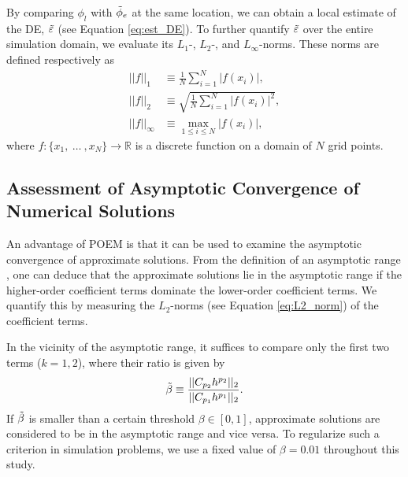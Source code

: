 By comparing $\phi_l$ with $\Tilde{\phi}_e$ at the same location, we can obtain a local estimate of the DE, $\Tilde{\varepsilon}$ (see Equation \ref{eq:est_DE}). To further quantify $\Tilde{\varepsilon}$ over the entire simulation domain, we evaluate its $L_1$-, $L_2$-, and $L_{\infty}$-norms. These norms are defined respectively as
\begin{align}
    ||f||_1 &\equiv \frac{1}{N}\sum_{i=1}^{N}|f(x_i)|, \label{eq:L1_norm} \\
    ||f||_2 &\equiv \sqrt{\frac{1}{N}\sum_{i=1}^{N}|f(x_i)|^2}, \label{eq:L2_norm} \\
    ||f||_{\infty} &\equiv \max_{1 \leq i \leq N} |f(x_i)|, \label{eq:L8_norm}
\end{align}
where $f:\{x_1,\ \dots \ ,x_N\} \rightarrow \mathbb{R}$ is a discrete function on a domain of $N$ grid points.


\subsection{Assessment of Asymptotic Convergence of Numerical Solutions}
An advantage of POEM is that it can be used to examine the asymptotic convergence of approximate solutions. From the definition of an asymptotic range \cite{Roy2010}, one can deduce that the approximate solutions lie in the asymptotic range if the higher-order coefficient terms dominate the lower-order coefficient terms. We quantify this by measuring the $L_2$-norms (see Equation \ref{eq:L2_norm}) of the coefficient terms.

In the vicinity of the asymptotic range, it suffices to compare only the first two terms ($k = 1,2$), where their ratio is given by
\begin{equation} \label{eq:beta_tilde}
    \Tilde{\beta} \equiv \frac{||C_{p_2} h^{p_2}||_2}{||C_{p_1} h^{p_1}||_2}.
\end{equation}
If $\Tilde{\beta}$ is smaller than a certain threshold $\beta \in [0,1]$, approximate solutions are considered to be in the asymptotic range and vice versa. To regularize such a criterion in simulation problems, we use a fixed value of $\beta = 0.01$ throughout this study.


